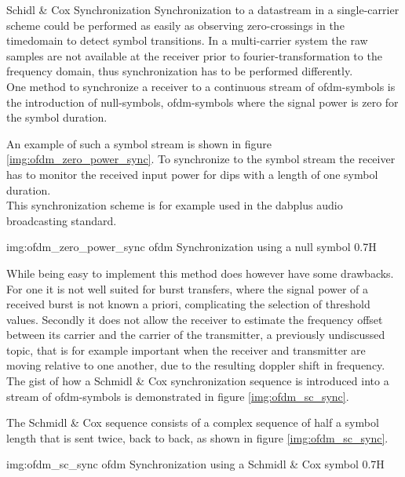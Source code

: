 \begin{subchapter}{Schidl \& Cox Synchronization}
  Synchronization to a datastream in a single-carrier scheme
  could be performed as easily as observing zero-crossings in the
  timedomain to detect symbol transitions.
  In a multi-carrier system the raw samples are not available
  at the receiver prior to fourier-transformation to the
  frequency domain, thus synchronization has to be performed
  differently. \\

  One method to synchronize a receiver to a continuous stream
  of \gls{ofdm}-symbols is the introduction of null-symbols,
  \gls{ofdm}-symbols where the signal power is zero for the
  symbol duration.

  An example of such a symbol stream is shown in figure
  \ref{img:ofdm_zero_power_sync}.
  To synchronize to the symbol stream the receiver has
  to monitor the received input power for dips with a
  length of one symbol duration. \\

  This synchronization scheme is for example used in
  the \acrshort{dabplus} audio broadcasting standard.

               {img:ofdm_zero_power_sync}
               {\acrshort{ofdm} Synchronization using a null symbol}
               {0.7}{H}

  While being easy to implement this method does however
  have some drawbacks.
  For one it is not well suited for burst transfers,
  where the signal power of a received burst is not
  known a priori, complicating the selection of threshold
  values.
  Secondly it does not allow the receiver to estimate the
  frequency offset between its carrier and the carrier of the
  transmitter, a previously undiscussed topic, that is
  for example important when the receiver and transmitter
  are moving relative to one another, due to the resulting doppler
  shift in frequency. \\

  The gist of how a Schmidl \& Cox synchronization sequence
  is introduced into a stream of \gls{ofdm}-symbols is
  demonstrated in figure \ref{img:ofdm_sc_sync}.

  The Schmidl \& Cox sequence consists of a complex sequence
  of half a symbol length that is sent twice, back to back,
  as shown in figure \ref{img:ofdm_sc_sync}.

               {img:ofdm_sc_sync}
               {\acrshort{ofdm} Synchronization using a Schmidl \& Cox symbol}
               {0.7}{H}


\end{subchapter}
